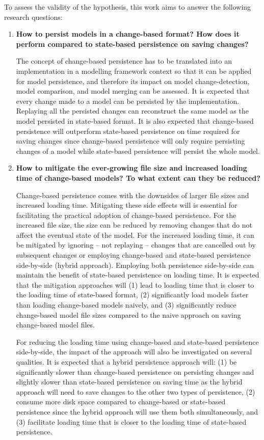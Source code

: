 \documentclass[12pt, a4paper]{report} \usepackage[titletoc]{appendix}
\begin{document}
To assess the validity of the hypothesis, this work aims to answer the following research questions: 
\begin{enumerate} 
	\item \textbf{How to persist models in a change-based format? How does it perform compared to state-based persistence on saving changes?} 
	
	The concept of change-based persistence has to be translated into an implementation in a modelling framework context so that it can be applied for model persistence, and therefore its impact on model change-detection, model comparison, and model merging can be assessed. It is expected that every change made to a model can be persisted by the implementation. Replaying all the persisted changes can reconstruct the same model as the model persisted in state-based format. It is also expected that change-based persistence will outperform state-based persistence on time required for saving changes since change-based persistence will only require persisting changes of a model while state-based persistence will persist the whole model. 
	
	\item \textbf{How to mitigate the ever-growing file size and increased loading time of change-based models? To what extent can they be reduced?} 
	
    Change-based persistence comes with the downsides of larger file sizes and increased loading time. Mitigating these side effects will is essential for facilitating the practical adoption of change-based persistence. For the increased file size, the size can be reduced by removing changes that do not affect the eventual state of the model. For the increased loading time, it can be mitigated by ignoring -- not replaying -- changes that are cancelled out by subsequent changes or employing change-based and state-based persistence side-by-side (hybrid approach). Employing both persistence side-by-side can maintain the benefit of state-based persistence on loading time. It is expected that the mitigation approaches will (1) lead to loading time that is closer to the loading time of state-based format, (2) significantly load models faster than loading change-based models naively, and (3) significantly reduce change-based model file sizes compared to the naive approach on saving change-based model files. 

	For reducing the loading time using change-based and state-based persistence side-by-side, the impact of the approach will also be investigated on several qualities. It is expected that a hybrid persistence approach will: (1) be significantly slower than change-based persistence on persisting changes and slightly slower than state-based persistence on saving time as the hybrid approach will need to save changes to the other two types of persistence, (2) consume more disk space compared to change-based or state-based persistence since the hybrid approach will use them both simultaneously, and (3) facilitate loading time that is closer to the loading time of state-based persistence. 
    

\end{enumerate}
\end{document}
